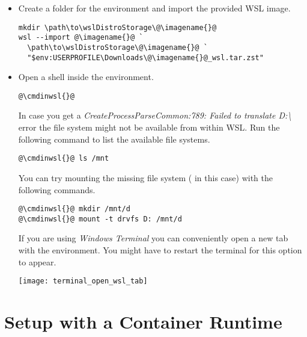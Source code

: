 \begin{itemize}
  \item Create a folder for the environment and import the provided WSL image.
        \begin{lstlisting}
mkdir \path\to\wslDistroStorage\@\imagename{}@
wsl --import @\imagename{}@ `
  \path\to\wslDistroStorage\@\imagename{}@ `
  "$env:USERPROFILE\Downloads\@\imagename{}@_wsl.tar.zst"
\end{lstlisting}

  \item Open a shell inside the environment.

        \begin{lstlisting}
@\cmdinwsl{}@
\end{lstlisting}

    \begin{infobox}
      In case you get a \emph{CreateProcessParseCommon:789: Failed to translate D:\textbackslash} error the file system might not be available from within WSL.
      Run the following command to list the available file systems.

          \begin{lstlisting}
@\cmdinwsl{}@ ls /mnt
\end{lstlisting}

      You can try mounting the missing file system ( in this case) with the following commands.

          \begin{lstlisting}
@\cmdinwsl{}@ mkdir /mnt/d
@\cmdinwsl{}@ mount -t drvfs D: /mnt/d
\end{lstlisting}
    \end{infobox}
    \begin{infobox}
      If you are using \emph{Windows Terminal} you can conveniently open a new tab with the environment.
      You might have to restart the terminal for this option to appear.
      \begin{center}
        \texttt{[image: terminal\_open\_wsl\_tab]}
      \end{center}
    \end{infobox}
\end{itemize}

\newpage

\section{Setup with a Container Runtime}

